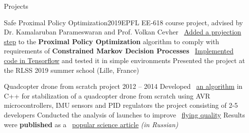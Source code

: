 \documentclass{resume} %
\newcommand*{\img}[1]{%
	\raisebox{-.02\baselineskip}{%
		\texttt{[image: \#1]}%
	}%
}
\newcommand*{\emoji}[1]{\img{./emoji/#1.png}}
\newcommand{\mylink}{{\color{gray}\faExternalLink}}
\begin{document}
\begin{rSection}{Projects}

	\begin{rSubsection}{Safe Proximal Policy Optimization}{2019}{EPFL EE-618 course project, advised by Dr. Kamalaruban Parameswaran and Prof. Volkan Cevher \emoji{flag-ch}}{}
		\myitem \mylink~\href{https://www.overleaf.com/read/cvxkswbspgpb}{Added a projection step} to the {\bf Proximal Policy Optimization} algorithm to comply with requirements of {\bf Constrained Markov Decision Processes}
		\myitem \mylink~\href{https://github.com/sergeivolodin/SafeContinuousStateRL}{Implemented code in Tensorflow} and tested it in simple environments
		\myitem Presented the project at the RLSS 2019 summer school (Lille, France)
	\end{rSubsection}

	\begin{rSubsection}{Quadcopter drone from scratch project \emoji{flag-ru}}{2012 -- 2014}{}{}
		\myitem Developed \mylink~\href{https://github.com/it-workshop/Quadrocopter}{an algorithm} in C++ for stabilization of a quadcopter drone from scratch using AVR microcontrollers, IMU sensors and PID regulators
		 the project consisting of 2-5 developers
		\myitem Conducted the analysis of launches to improve \mylink~\href{https://www.youtube.com/watch?v=AxDoO-gNRtc}{flying quality}
		\myitem Results were {\bf published} as a \mylink~\href{http://web.archive.org/web/20141016114551/http://habrahabr.ru/company/technoworks/blog/216437/}{popular science article} {\em (in Russian)}
	\end{rSubsection}
\end{rSection}
\end{document}
